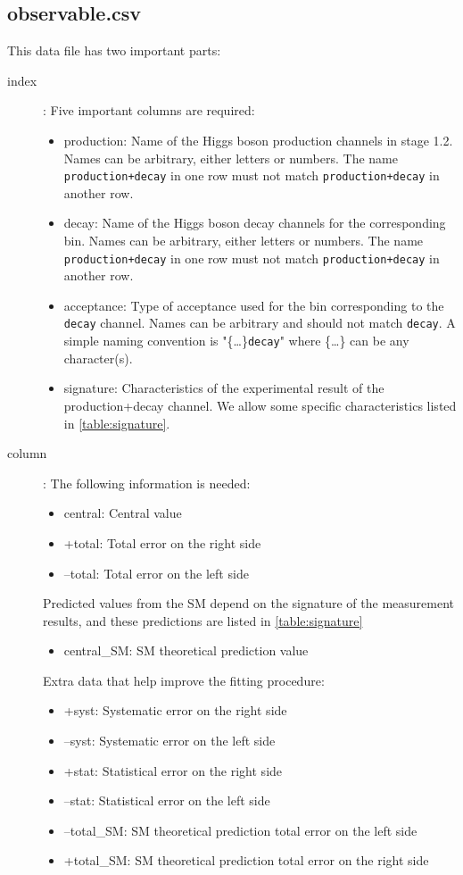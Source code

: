 \documentclass[12pt]{article}
\begin{document}
 \subsection{observable.csv}
 This data file has two important parts:
 \begin{description}
   \item[{\color{red}index}]: Five important columns are required:
   \begin{itemize}
   \item production: Name of the Higgs boson production channels in stage 1.2. Names can be arbitrary, either letters or numbers. The name \verb|production+decay| in one row must not match \verb|production+decay| in another row.
   \item decay: Name of the Higgs boson decay channels for the corresponding bin. Names can be arbitrary, either letters or numbers. The name \verb|production+decay| in one row must not match \verb|production+decay| in another row.
   \item acceptance: Type of acceptance used for the bin corresponding to the \verb|decay| channel. Names can be arbitrary and should not match \verb|decay|. A simple naming convention is "\{\dots\}\verb|decay|" where \{\dots\} can be any character(s).
   \item signature: Characteristics of the experimental result of the production+decay channel. We allow some specific characteristics listed in \ref{table:signature}.
  \end{itemize}
  \item[{\color{blue} column}]: The following information is needed:
   \begin{itemize}
         \item central: Central value
         \item +total: Total error on the right side
         \item --total: Total error on the left side
   \end{itemize}
   Predicted values from the SM depend on the signature of the measurement results, and these predictions are listed in \ref{table:signature} 
   \begin{itemize}
         \item central\_SM: SM theoretical prediction value
        \end{itemize}
    Extra data that help improve the fitting procedure:
        \begin{itemize}
          \item +syst: Systematic error on the right side
          \item --syst: Systematic error on the left side
          \item +stat: Statistical error on the right side
          \item --stat: Statistical error on the left side
          \item --total\_SM: SM theoretical prediction total error on the left side
          \item +total\_SM:  SM theoretical prediction total error on the right side
   \end{itemize}
  \end{description}
 
\end{document}
